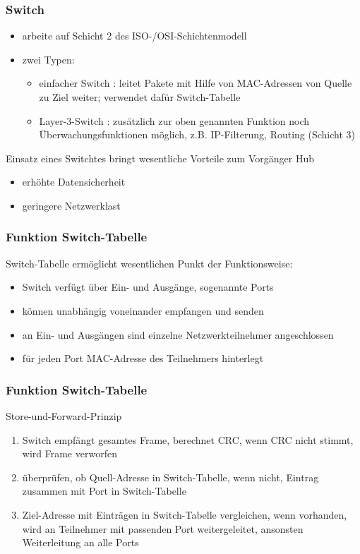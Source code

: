 \documentclass{beamer}
\begin{document}
        \begin{frame}
          	\frametitle{Switch}
            	\begin{itemize}
            	\item arbeite auf Schicht 2 des ISO-/OSI-Schichtenmodell
            	\item zwei Typen:
            	\begin{itemize}
            	\item einfacher Switch : leitet Pakete mit Hilfe von MAC-Adressen von Quelle zu Ziel weiter; verwendet dafür Switch-Tabelle
            	\item Layer-3-Switch : zusätzlich zur oben genannten Funktion noch Überwachungsfunktionen möglich, z.B. IP-Filterung, Routing (Schicht 3)
            	\end{itemize}
            	\end{itemize}
            	Einsatz eines Switchtes bringt wesentliche Vorteile zum Vorgänger Hub
            	\begin{itemize}
            		\item erhöhte Datensicherheit
            		\item geringere Netzwerklast	
            	\end{itemize}
        \end{frame}
        
        \begin{frame}
        	\frametitle{Funktion Switch-Tabelle}
        	Switch-Tabelle ermöglicht wesentlichen Punkt der Funktionsweise:
        	\begin{itemize}
        	\item Switch verfügt über Ein- und Ausgänge, sogenannte Ports
        	\item können unabhängig voneinander empfangen und senden
        	\item an Ein- und Ausgängen sind einzelne Netzwerkteilnehmer angeschlossen
        	\item für jeden Port MAC-Adresse des Teilnehmers hinterlegt
        	\end{itemize}  	
    	\end{frame}
    	
    	\begin{frame}
	       	\frametitle{Funktion Switch-Tabelle}
	       	Store-und-Forward-Prinzip
	       	\begin{enumerate}
	       	\item Switch empfängt gesamtes Frame, berechnet CRC, wenn CRC nicht stimmt, wird Frame verworfen
	       	\item überprüfen, ob Quell-Adresse in Switch-Tabelle, wenn nicht, Eintrag zusammen mit Port in Switch-Tabelle
	       	\item Ziel-Adresse mit Einträgen in Switch-Tabelle vergleichen, wenn vorhanden, wird an Teilnehmer mit passenden Port weitergeleitet, ansonsten Weiterleitung an alle Ports
	       	\end{enumerate}  	
	   	\end{frame}
    	
\end{document}
